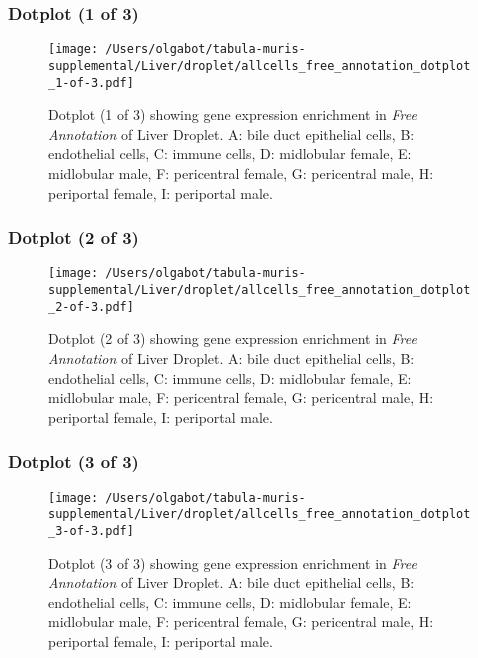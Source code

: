 \clearpage

\subsubsection{Dotplot (1 of 3)}
\begin{figure}[h]
\centering
\texttt{[image: /Users/olgabot/tabula-muris-supplemental/Liver/droplet/allcells\_free\_annotation\_dotplot\_1-of-3.pdf]}

\caption{ Dotplot (1 of 3)  showing gene expression enrichment in \emph{Free Annotation} of Liver Droplet. A: bile duct epithelial cells, B: endothelial cells, C: immune cells, D: midlobular female, E: midlobular male, F: pericentral female, G: pericentral male, H: periportal female, I: periportal male.}
\end{figure}


\clearpage

\subsubsection{Dotplot (2 of 3)}
\begin{figure}[h]
\centering
\texttt{[image: /Users/olgabot/tabula-muris-supplemental/Liver/droplet/allcells\_free\_annotation\_dotplot\_2-of-3.pdf]}

\caption{ Dotplot (2 of 3)  showing gene expression enrichment in \emph{Free Annotation} of Liver Droplet. A: bile duct epithelial cells, B: endothelial cells, C: immune cells, D: midlobular female, E: midlobular male, F: pericentral female, G: pericentral male, H: periportal female, I: periportal male.}
\end{figure}


\clearpage

\subsubsection{Dotplot (3 of 3)}
\begin{figure}[h]
\centering
\texttt{[image: /Users/olgabot/tabula-muris-supplemental/Liver/droplet/allcells\_free\_annotation\_dotplot\_3-of-3.pdf]}

\caption{ Dotplot (3 of 3)  showing gene expression enrichment in \emph{Free Annotation} of Liver Droplet. A: bile duct epithelial cells, B: endothelial cells, C: immune cells, D: midlobular female, E: midlobular male, F: pericentral female, G: pericentral male, H: periportal female, I: periportal male.}
\end{figure}


